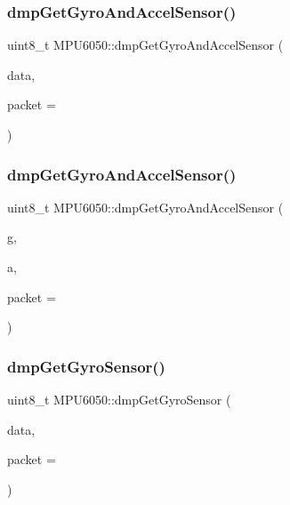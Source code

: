 \mbox{\label{classMPU6050_ad8caffca939574f73c7c300baee339b7}} 
\subsubsection{\texorpdfstring{dmpGetGyroAndAccelSensor()}{dmpGetGyroAndAccelSensor()}\hspace{0.1cm}{\footnotesize\ttfamily [2/3]}}
{\footnotesize\ttfamily uint8\+\_\+t M\+P\+U6050\+::dmp\+Get\+Gyro\+And\+Accel\+Sensor (\begin{DoxyParamCaption}\item[{int16\+\_\+t $\ast$}]{data,  }\item[{const uint8\+\_\+t $\ast$}]{packet = {} }\end{DoxyParamCaption})}

\mbox{\label{classMPU6050_a13b5eff727ce232fef884ee67df4487f}} 
\subsubsection{\texorpdfstring{dmpGetGyroAndAccelSensor()}{dmpGetGyroAndAccelSensor()}\hspace{0.1cm}{\footnotesize\ttfamily [3/3]}}
{\footnotesize\ttfamily uint8\+\_\+t M\+P\+U6050\+::dmp\+Get\+Gyro\+And\+Accel\+Sensor (\begin{DoxyParamCaption}\item[{\mbox{\hyperlink{classVectorInt16}{Vector\+Int16}} $\ast$}]{g,  }\item[{\mbox{\hyperlink{classVectorInt16}{Vector\+Int16}} $\ast$}]{a,  }\item[{const uint8\+\_\+t $\ast$}]{packet = {} }\end{DoxyParamCaption})}

\mbox{\label{classMPU6050_adfe0bc92f57cf489583d5c3b07d7aefb}} 
\subsubsection{\texorpdfstring{dmpGetGyroSensor()}{dmpGetGyroSensor()}\hspace{0.1cm}{\footnotesize\ttfamily [1/3]}}
{\footnotesize\ttfamily uint8\+\_\+t M\+P\+U6050\+::dmp\+Get\+Gyro\+Sensor (\begin{DoxyParamCaption}\item[{int32\+\_\+t $\ast$}]{data,  }\item[{const uint8\+\_\+t $\ast$}]{packet = {} }\end{DoxyParamCaption})}

